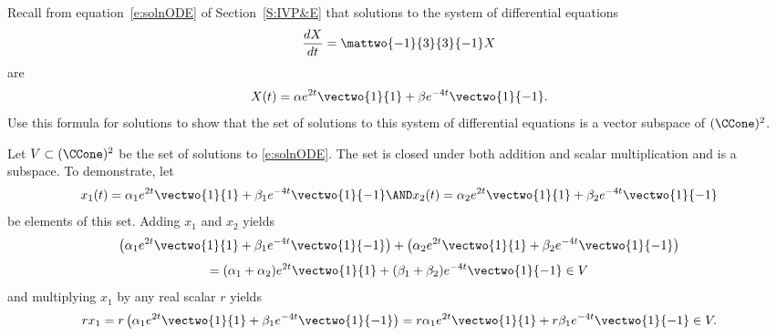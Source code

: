 \documentclass{article}
\begin{document}



\problemlabel

\begin{exercise} \label{c5.1.9}
Recall from equation~\eqref{e:solnODE} of Section~\ref{S:IVP&E}
that solutions to the system of differential equations
\[
\frac{dX}{dt} = \mattwo{-1}{3}{3}{-1} X
\]
are
\[
X(t) = \alpha e^{2t}\vectwo{1}{1} + \beta e^{-4t}\vectwo{1}{-1}.
\]
Use this formula for solutions to show that the set of solutions
to this system of differential equations is a vector subspace of
$(\CCone)^2$.

\begin{solution}

Let $V \subset (\CCone)^2$ be the set of solutions to \eqref{e:solnODE}.
The set is closed under both addition and scalar multiplication and
is a subspace.
To demonstrate, let
\[
x_1(t) = \alpha_1 e^{2t}\vectwo{1}{1} +
\beta_1 e^{-4t}\vectwo{1}{-1} \AND x_2(t) =
\alpha_2 e^{2t}\vectwo{1}{1} + \beta_2 e^{-4t}\vectwo{1}{-1}
\]
be elements of this set.  Adding $x_1$ and $x_2$ yields
\[
\left(\alpha_1 e^{2t}\vectwo{1}{1} +
\beta_1 e^{-4t}\vectwo{1}{-1}\right) +
\left(\alpha_2 e^{2t}\vectwo{1}{1}
+ \beta_2 e^{-4t}\vectwo{1}{-1}\right)
\]
\[
= (\alpha_1 + \alpha_2)e^{2t}\vectwo{1}{1} +
(\beta_1 + \beta_2) e^{-4t}\vectwo{1}{-1} \in V
\]
and multiplying $x_1$ by any real scalar $r$ yields
\[
rx_1 = r\left(\alpha_1 e^{2t}\vectwo{1}{1} +
\beta_1 e^{-4t}\vectwo{1}{-1}\right) = r\alpha_1 e^{2t}\vectwo{1}{1} +
r\beta_1 e^{-4t}\vectwo{1}{-1} \in V.
\]



\end{solution}
\end{exercise}


\end{document}
